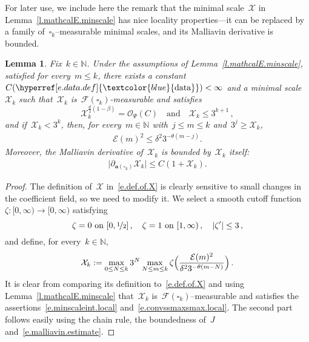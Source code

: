 \documentclass[11pt,twoside]{article} %
\let\oldsquare\square %
\renewcommand{\square}{\oldsquare}
\numberwithin{equation}{section}
\newtheorem{lemma}[theorem]{Lemma}
\theoremstyle{definition}
\newcommand{\dataref}{\hyperref[e.data.def]{\textcolor{blue}{\ensuremath{\mathrm{data}}}}}
\newcommand*{\N}{\ensuremath{\mathbb{N}}}
\newcommand{\qand}{\quad \mbox{and} \quad }
\renewcommand{\a}{\mathbf{a}}
\newcommand{\cu}{\square}
\newcommand{\F}{\mathcal{F}}
\newcommand{\X}{\mathcal{X}}
\renewcommand{\O}{\mathcal{O}}
\begin{document}
For later use, we include here the remark that the minimal scale~$\X$ in Lemma~\ref{l.mathcalE.minscale} has nice locality properties---it can be replaced by a family of~$\cu_k$--measurable minimal scales, and its Malliavin derivative is bounded. 

\begin{lemma} 
\label{l.localX}
Fix~$k \in \N$. Under the assumptions of Lemma~\ref{l.mathcalE.minscale}, satisfied for every~$m \leq k$, there exists a constant~$C(\dataref)<\infty$ and a minimal scale~$\X_k$ such that~$\X_k$ is~$\F(\cu_k)$-measurable and satisfies 
\begin{equation}
\label{e.minscaleint.local}
\X_k^{\frac d2 (1-\beta)}
= 
\O_{\Psi}(C) \qand
\X_k \leq 3^{k+1}\,,
\end{equation}
and if~$\X_k < 3^k$, then, for every~$m \in \N$ with~$j \leq m \leq k$ and~$3^j \geq \X_k$,
\begin{align}
\label{e.convssmaxsmax.local}
\mathcal{E}(m)^2
\leq
\delta^2 3^{-\theta(m-j)}.
\end{align}
Moreover, the Malliavin derivative of~$\X_k$ is bounded by~$\X_k$ itself:
\begin{align} \label{e.mallliavin.local}
\bigl| \partial_{\a(\cu_k)} \X_k  \bigr| \leq C (1+\X_k) .
\end{align}
\end{lemma}
\begin{proof}
The definition of~$\X$ in~\eqref{e.def.of.X} is clearly sensitive to small changes in the coefficient field, so we need to modify it. 
We select a smooth cutoff function~$\zeta:[0,\infty) \to [0,\infty)$ satisfying 
\begin{equation*}
\zeta = 0 \ \text{on} \ [0,\nicefrac12] 
\,, \quad
\zeta = 1 \ \text{on} \ [1,\infty)  
\,, \quad
| \zeta' | \leq 3
\,,
\end{equation*}
and define, for every~$k\in\N$,
\begin{equation*}
\X_k 
:= 
\max_{0 \leq N \leq k} 
3^N
\max_{N \leq m \leq k} 
\zeta \Bigl( \frac{\mathcal{E}(m)^2}{\delta^2 3^{-\theta(m-N)} } \Bigr) 
\,.
\end{equation*}
It is clear from comparing its definition to~\eqref{e.def.of.X} and using Lemma~\ref{l.mathcalE.minscale} that~$\X_k$ is~$\F(\cu_k)$--measurable and satisfies the assertions~\eqref{e.minscaleint.local} and~\eqref{e.convssmaxsmax.local}. 
The second part follows easily using the chain rule, the boundedness of~$J$ and~\eqref{e.malliavin.estimate}. \end{proof}
\end{document}
